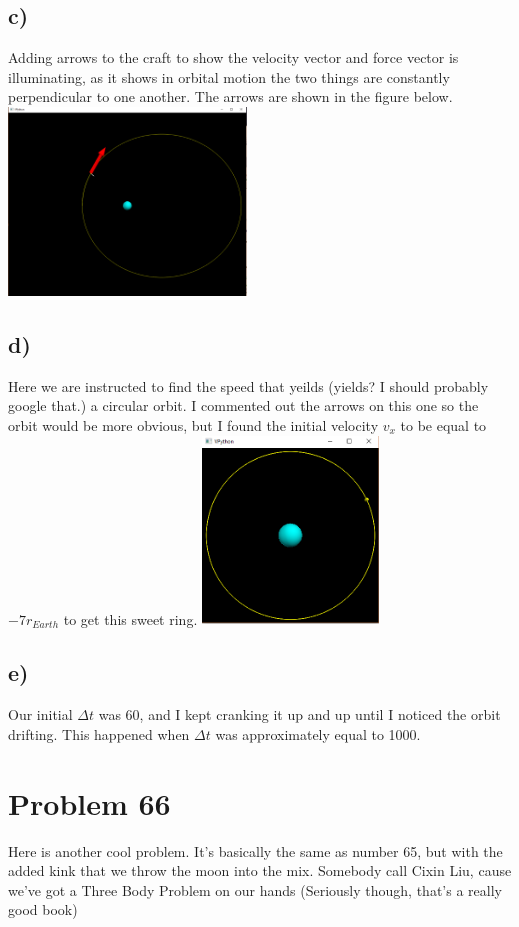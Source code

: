 \documentclass[a4paper,11pt]{article}
\begin{document}
\subsection{c)}
Adding arrows to the craft to show the velocity vector and force vector is illuminating, as it shows in orbital motion the two things are constantly perpendicular to one another. The arrows are shown in the figure below.
\centering
\\
\includegraphics[height = 5cm]{Untitled65.png}
\flushleft{}

\subsection{d)}
Here we are instructed to find the speed that yeilds (yields? I should probably google that.) a circular orbit. I commented out the arrows on this one so the orbit would be more obvious, but I found the initial velocity $v_x$ to be equal to $-7r_{Earth}$ to get this sweet ring.
\centering
\includegraphics[height=5cm]{Untitled652.png}
\flushleft{}

\subsection{e)}
Our initial $\Delta t$ was 60, and I kept cranking it up and up until I noticed the orbit drifting. This happened when $\Delta t$ was approximately equal to 1000.

\section{Problem 66}
Here is another cool problem. It's basically the same as number 65, but with the added kink that we throw the moon into the mix. Somebody call Cixin Liu, cause we've got a Three Body Problem on our hands (Seriously though, that's a really good book)
\end{document}
